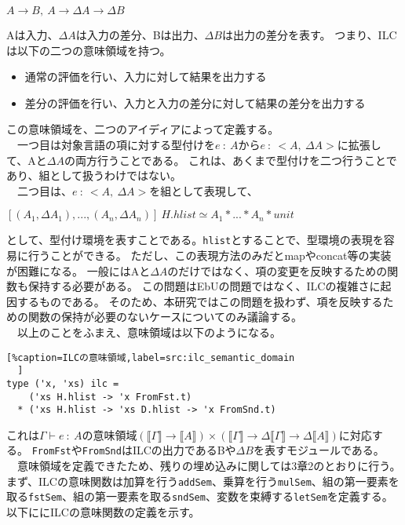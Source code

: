 \documentclass[uplatex]{sumiilab-paper}
\theoremstyle{mystyle}
\numberwithin{definition}{chapter} %
\begin{document}
$A \rightarrow B,~A \rightarrow \Delta A \rightarrow \Delta B$

Aは入力、$\Delta A$は入力の差分、Bは出力、$\Delta B$は出力の差分を表す。
つまり、ILCは以下の二つの意味領域を持つ。

\begin{itemize}
  \item 通常の評価を行い、入力に対して結果を出力する
  \item 差分の評価を行い、入力と入力の差分に対して結果の差分を出力する
\end{itemize}

この意味領域を、二つのアイディアによって定義する。\\
　一つ目は対象言語の項に対する型付けを$e~:~A$から$e~:~<A,~\Delta A>$に拡張して、Aと$\Delta A$の両方行うことである。
これは、あくまで型付けを二つ行うことであり、組として扱うわけではない。\\
　二つ目は、$e~:~<A,~\Delta A>$を組として表現して、

$[(A_1,\Delta A_1),...,(A_n,\Delta A_n)]~H.hlist \simeq A_1*...*A_n*unit$

として、型付け環境を表すことである。{\tt hlist}とすることで、型環境の表現を容易に行うことができる。
ただし、この表現方法のみだとmapやconcat等の実装が困難になる。
一般にはAと$\Delta A$のだけではなく、項の変更を反映するための関数も保持する必要がある。
この問題はEbUの問題ではなく、ILCの複雑さに起因するものである。
そのため、本研究ではこの問題を扱わず、項を反映するための関数の保持が必要のないケースについてのみ議論する。\\
　以上のことをふまえ、意味領域は以下のようになる。

\begin{lstlisting}[%caption=ILCの意味領域,label=src:ilc_semantic_domain
  ]
type ('x, 'xs) ilc = 
    ('xs H.hlist -> 'x FromFst.t) 
  * ('xs H.hlist -> 'xs D.hlist -> 'x FromSnd.t)             
\end{lstlisting}

これは$\Gamma \vdash e~:~A$の意味領域$(\llbracket \Gamma \rrbracket \rightarrow \llbracket A \rrbracket) \times (\llbracket \Gamma \rrbracket \rightarrow \Delta \llbracket \Gamma \rrbracket \rightarrow \Delta \llbracket A \rrbracket)$に対応する。
{\tt FromFst}や{\tt FromSnd}はILCの出力であるBや$\Delta B$を表すモジュールである。\\
　意味領域を定義できたため、残りの埋め込みに関しては3章2のとおりに行う。
まず、ILCの意味関数は加算を行う{\tt addSem}、乗算を行う{\tt mulSem}、組の第一要素を取る{\tt fstSem}、組の第一要素を取る{\tt sndSem}、変数を束縛する{\tt letSem}を定義する。
以下ににILCの意味関数の定義を示す。
\end{document}
